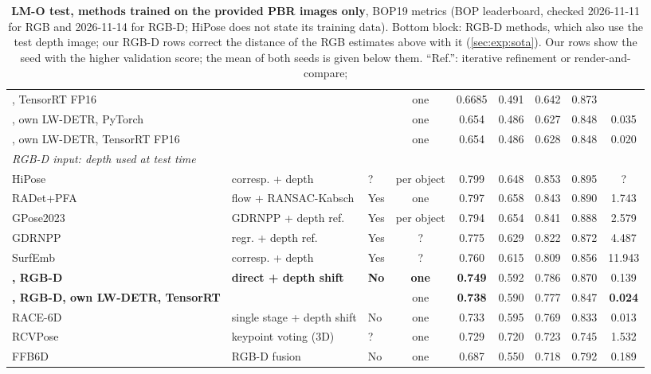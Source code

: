 \begin{table}[t]
\begin{tabular}{lllcccccc}
    \ours{}, TensorRT FP16 & & & one & 0.6685 & 0.491 & 0.642 & 0.873 & \\
    \ours{}, own LW-DETR, PyTorch & & & one & 0.654 & 0.486 & 0.627 & 0.848 & 0.035 \\
    \ours{}, own LW-DETR, TensorRT FP16 & & & one & 0.654 & 0.486 & 0.628 & 0.848 & 0.020 \\
    \midrule
    \multicolumn{9}{l}{\emph{RGB-D input: depth used at test time}} \\
    HiPose~\cite{lin2024hipose} & corresp. + depth & ? & per object & 0.799 & 0.648 & 0.853 & 0.895 & ? \\
    RADet+PFA~\cite{hai2023radet,hu2022pfa} & flow + RANSAC-Kabsch & Yes & one & 0.797 & 0.658 & 0.843 & 0.890 & 1.743 \\
    GPose2023~\cite{bop_gpose2023} & GDRNPP + depth ref. & Yes & per object & 0.794 & 0.654 & 0.841 & 0.888 & 2.579 \\
    GDRNPP~\cite{liu2022gdrnpp} & regr. + depth ref. & Yes & ? & 0.775 & 0.629 & 0.822 & 0.872 & 4.487 \\
    SurfEmb~\cite{haugaard2022surfemb} & corresp. + depth & Yes & ? & 0.760 & 0.615 & 0.809 & 0.856 & 11.943 \\
    \textbf{\ours{}, RGB-D} & \textbf{direct + depth shift} & \textbf{No} & \textbf{one} & \textbf{0.749} & 0.592 & 0.786 & 0.870 & 0.139 \\
    \textbf{\ours{}, RGB-D, own LW-DETR, TensorRT} & & & one & \textbf{0.738} & 0.590 & 0.777 & 0.847 & \textbf{0.024} \\
    RACE-6D~\cite{ha2026race6d} & single stage + depth shift & No & one & 0.733 & 0.595 & 0.769 & 0.833 & 0.013 \\
    RCVPose~\cite{wu2022rcvpose} & keypoint voting (3D) & ? & one & 0.729 & 0.720 & 0.723 & 0.745 & 1.532 \\
    FFB6D~\cite{he2021ffb6d} & RGB-D fusion & No & one & 0.687 & 0.550 & 0.718 & 0.792 & 0.189 \\
    \bottomrule
  \end{tabular}
  \caption{\textbf{LM-O test, methods trained on the provided PBR images only}, BOP19 metrics
  (BOP leaderboard, checked 2026-11-11 for RGB and 2026-11-14 for RGB-D; HiPose does not state its
  training data). Bottom block: RGB-D methods, which also use the test depth image; our RGB-D rows
  correct the distance of the RGB estimates above with it (\cref{sec:exp:sota}). Our rows show
  the seed with the higher validation score; the mean of both seeds is given below them. ``Ref.'': iterative refinement or render-and-compare;
}
\end{table}
